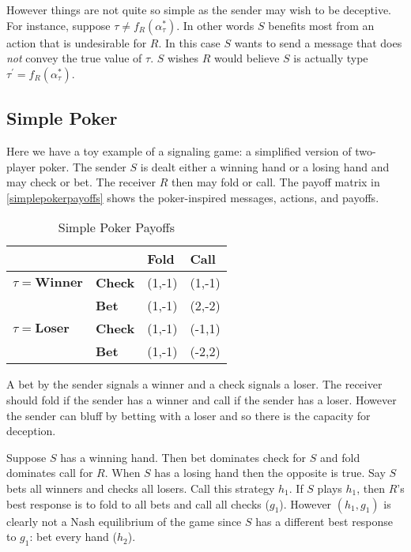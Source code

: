 \documentclass{article}
\begin{document}
However things are not quite so simple as the sender may wish to be deceptive. For instance, suppose $\tau \ne f_R(\alpha_\tau^*)$. In other words $S$ benefits most from an action that is undesirable for $R$. In this case $S$ wants to send a message that does \emph{not} convey the true value of $\tau$. $S$ wishes $R$ would believe $S$ is actually type $\tau^\prime = f_R(\alpha_\tau^*)$.

\subsection{Simple Poker}

Here we have a toy example of a signaling game: a simplified version of two-player poker. The sender $S$ is dealt either a winning hand or a losing hand and may check or bet. The receiver $R$ then may fold or call. The payoff matrix in \autoref{simplepokerpayoffs} shows the poker-inspired messages, actions, and payoffs.

\begin{table}[H]
	\centering
	\caption{Simple Poker Payoffs}
	\label{simplepokerpayoffs}
	\begin{tabular}{ll|l|l|}
		\cline{3-4}&       & \textbf{Fold} & \textbf{Call} \\ \hline
		\multicolumn{1}{|l|}{$\tau=\textbf{Winner}$} & \textbf{Check} & (1,-1)  & (1,-1)  \\ \cline{2-4}
		\multicolumn{1}{|l|}{}        & \textbf{Bet}   & (1,-1)  & (2,-2)  \\ \hline
		\multicolumn{1}{|l|}{$\tau=\textbf{Loser}$}  & \textbf{Check} & (1,-1)  & (-1,1)  \\ \cline{2-4}
		\multicolumn{1}{|l|}{}        & \textbf{Bet}   & (1,-1)  & (-2,2) \\ \hline
	\end{tabular}
\end{table}
A bet by the sender signals a winner and a check signals a loser. The receiver should fold if the sender has a winner and call if the sender has a loser. However the sender can bluff by betting with a loser and so there is the capacity for deception.

Suppose $S$ has a winning hand. Then bet dominates check for $S$ and fold dominates call for $R$. When $S$ has a losing hand then the opposite is true. Say $S$ bets all winners and checks all losers. Call this strategy $h_1$. If $S$ plays $h_1$, then $R$'s best response is to fold to all bets and call all checks ($g_1$). However $(h_1, g_1)$ is clearly not a Nash equilibrium of the game since $S$ has a different best response to $g_1$: bet every hand ($h_2$).
\end{document}
